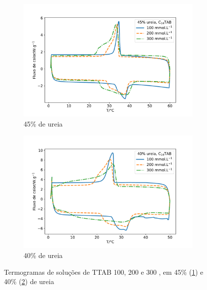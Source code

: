 		\begin{figure}[h]
			\centering
			\begin{subfigure}[t]{0.45\textwidth}
				\includegraphics[width=\textwidth]{./imagens/dsc/TTAB_45p}
				\caption{45\% de ureia}
				\label{fig:DSC_TTAB_UR45}
			\end{subfigure} \qquad %
			\begin{subfigure}[t]{0.45\textwidth}
				\includegraphics[width=\textwidth]{./imagens/dsc/TTAB_40p}
				\caption{40\% de ureia}
				\label{fig:DSC_TTAB_UR40}
			\end{subfigure}
			\caption{Termogramas de soluções de TTAB 100, 200 e 300 \mM{}, em 45\% (\ref{fig:DSC_TTAB_UR45}) e 40\% (\ref{fig:DSC_TTAB_UR40}) de ureia}
			\label{fig:DSC_TTAB_UR_40-45}
		\end{figure}
		
